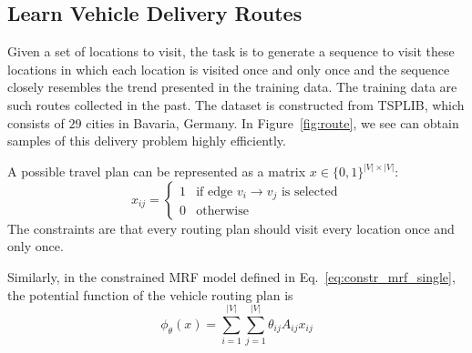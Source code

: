 %

\subsection{Learn Vehicle Delivery Routes}
Given a set of locations to visit, the task is to generate a sequence to visit
these locations in which each location is visited once and only once and the
sequence closely resembles the trend presented in the training data. The
training data are such routes collected in the past. The dataset is constructed
from TSPLIB, which consists of $29$ cities in Bavaria, Germany.
%
In Figure~\ref{fig:route}, we see \nls can obtain samples of this delivery
problem highly efficiently. %

A possible travel plan can be represented as a matrix $x\in\{0,1\}^{|V|\times
    |V|}$:
\begin{equation}\label{eq:route}
    x_{ij}=\begin{cases}
        1 & \text{if edge } v_i\to v_j \text{ is selected} \\
        0 & \text{otherwise}
    \end{cases}
\end{equation}
The constraints are that every  routing plan should visit every location once and only once.

Similarly, in the constrained MRF model defined in
Eq.~\eqref{eq:constr_mrf_single}, the potential function of the vehicle routing
plan is
\begin{equation*}
    \phi_{\theta}(x)=\sum_{i=1}^{|V|}\sum_{j=1}^{|V|}\theta_{ij}A_{ij}x_{ij}
\end{equation*}

%

